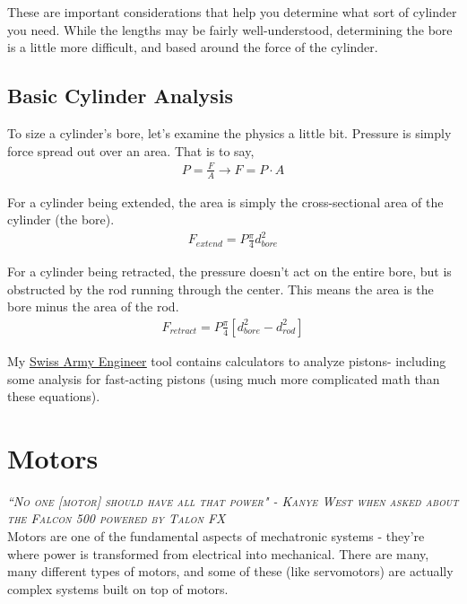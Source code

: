 \documentclass[10pt,letterpaper]{book}
\begin{document}
These are important considerations that help you determine what sort of cylinder you need. While the lengths may be fairly well-understood, determining the bore is a little more difficult, and based around the force of the cylinder.

\section{Basic Cylinder Analysis}

To size a cylinder's bore, let's examine the physics a little bit. Pressure is simply force spread out over an area. That is to say,
\begin{align}
	P = \frac{F}{A} \rightarrow F = P \cdot A
\end{align}

For a cylinder being extended, the area is simply the cross-sectional area of the cylinder (the bore).
\begin{align}
	F_{extend} = P \frac{\pi}{4} d_{bore}^2
\end{align}

For a cylinder being retracted, the pressure doesn't act on the entire bore, but is obstructed by the rod running through the center. This means the area is the bore minus the area of the rod.
\begin{align}
	F_{retract} = P \frac{\pi}{4} [ d_{bore}^2 - d_{rod}^2 ]
\end{align}

My \href{http://thaddeus-maximus.github.io/swissarmyengineer/}{\color{red}\underline{Swiss Army Engineer}} tool contains calculators to analyze pistons- including some analysis for fast-acting pistons (using much more complicated math than these equations).















\chapter{Motors}

 {\slshape \scshape ``No one [motor] should have all that power" - Kanye West when asked about the Falcon 500 powered by Talon FX}
 \\
 
 Motors are one of the fundamental aspects of mechatronic systems - they're where power is transformed from electrical into mechanical. There are many, many different types of motors, and some of these (like servomotors) are actually complex systems built on top of motors.
\end{document}
